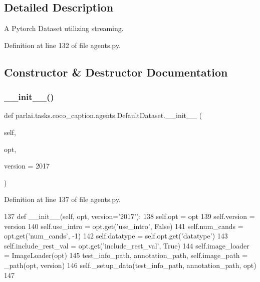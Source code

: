 \subsection{Detailed Description}
\begin{DoxyVerb}A Pytorch Dataset utilizing streaming.
\end{DoxyVerb}
 

Definition at line 132 of file agents.\+py.



\subsection{Constructor \& Destructor Documentation}
\mbox{\label{classparlai_1_1tasks_1_1coco__caption_1_1agents_1_1DefaultDataset_a2abc452a6af8c79ba5894a23803517e4}} 
\subsubsection{\texorpdfstring{\+\_\+\+\_\+init\+\_\+\+\_\+()}{\_\_init\_\_()}}
{\footnotesize\ttfamily def parlai.\+tasks.\+coco\+\_\+caption.\+agents.\+Default\+Dataset.\+\_\+\+\_\+init\+\_\+\+\_\+ (\begin{DoxyParamCaption}\item[{}]{self,  }\item[{}]{opt,  }\item[{}]{version = {\ttfamily \textquotesingle{}2017\textquotesingle{}} }\end{DoxyParamCaption})}



Definition at line 137 of file agents.\+py.


\begin{DoxyCode}
137     \textcolor{keyword}{def }\_\_init\_\_(self, opt, version='2017'):
138         self.opt = opt
139         self.version = version
140         self.use\_intro = opt.get(\textcolor{stringliteral}{'use\_intro'}, \textcolor{keyword}{False})
141         self.num\_cands = opt.get(\textcolor{stringliteral}{'num\_cands'}, -1)
142         self.datatype = self.opt.get(\textcolor{stringliteral}{'datatype'})
143         self.include\_rest\_val = opt.get(\textcolor{stringliteral}{'include\_rest\_val'}, \textcolor{keyword}{True})
144         self.image\_loader = ImageLoader(opt)
145         test\_info\_path, annotation\_path, self.image\_path = \_path(opt, version)
146         self.\_setup\_data(test\_info\_path, annotation\_path, opt)
147 
\end{DoxyCode}


